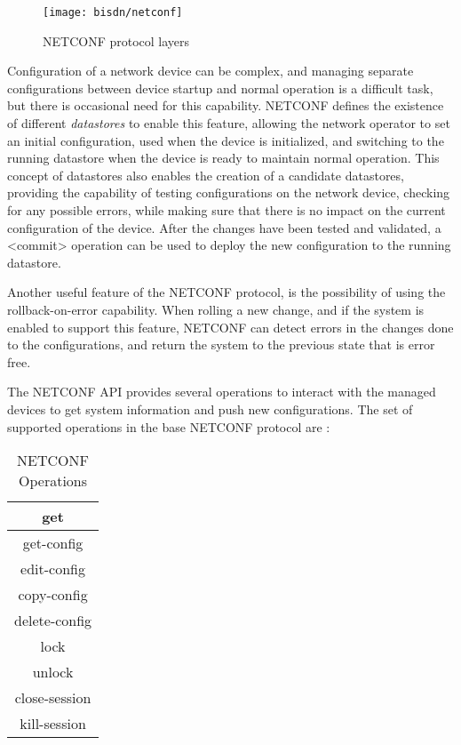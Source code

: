 \begin{figure} [!htbp]
    \centering
    \texttt{[image: bisdn/netconf]}
    \caption{NETCONF protocol layers \cite{enns_network_2011}}
    \label{fig:netconf_proto_layers}
\end{figure}

\par Configuration of a network device can be complex, and managing separate configurations between device startup and normal operation is a difficult task, but
there is occasional need for this capability. NETCONF defines the existence of different \textit{datastores} to enable this feature, allowing the network operator to
set an initial configuration, used when the device is initialized, and switching to the running datastore when the device is ready to maintain normal operation. This
concept of datastores also enables the creation of a candidate datastores, providing the capability of testing configurations on the network device, checking for any
possible errors, while making sure that there is no impact on the current configuration of the device. After the changes have been tested and validated, a <commit>
operation can be used to deploy the new configuration to the running datastore.

\par Another useful feature of the NETCONF protocol, is the possibility of using the rollback-on-error capability. When rolling a new change,
and if the system is enabled to support this feature, NETCONF can detect errors in the changes done to the configurations, and return the system to the previous
state that is error free. 

\par The NETCONF API provides several operations to interact with the managed devices to get system information and push new configurations. The set of supported 
operations in the base NETCONF protocol are \cite{enns_network_2011}:

\begin{table}[H]
    \centering
    \caption{NETCONF Operations}
    \begin{tabular}{c}
                 get \\ \hline
          get-config \\ \hline
         edit-config \\ \hline
         copy-config \\ \hline
       delete-config \\ \hline
                lock \\ \hline
              unlock \\ \hline
       close-session \\ \hline
        kill-session
    \end{tabular}
\end{table}

